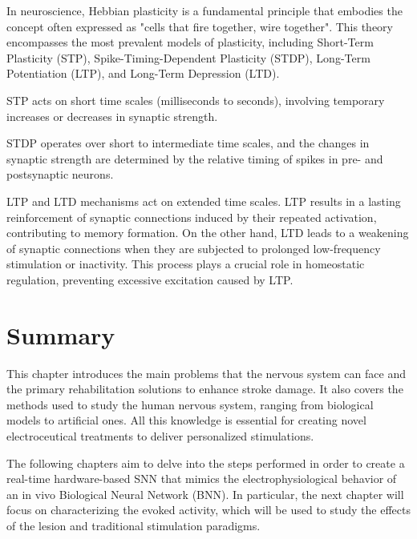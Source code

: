 In neuroscience, Hebbian plasticity \cite{Hebb1949} is a fundamental principle that embodies the concept often expressed as "cells that fire together, wire together". This theory encompasses the most prevalent models of plasticity, including Short-Term Plasticity (STP), Spike-Timing-Dependent Plasticity (STDP), Long-Term Potentiation (LTP), and Long-Term Depression (LTD).

STP acts on short time scales (milliseconds to seconds), involving temporary increases or decreases in synaptic strength.

STDP operates over short to intermediate time scales, and the changes in synaptic strength are determined by the relative timing of spikes in pre- and postsynaptic neurons.

LTP and LTD mechanisms act on extended time scales. LTP results in a lasting reinforcement of synaptic connections induced by their repeated activation, contributing to memory formation. On the other hand, LTD leads to a weakening of synaptic connections when they are subjected to prolonged low-frequency stimulation or inactivity. This process plays a crucial role in homeostatic regulation, preventing excessive excitation caused by LTP.

\section{Summary}

This chapter introduces the main problems that the nervous system can face and the primary rehabilitation solutions to enhance stroke damage. It also covers the methods used to study the human nervous system, ranging from biological models to artificial ones. All this knowledge is essential for creating novel electroceutical treatments to deliver personalized stimulations.

The following chapters aim to delve into the steps performed in order to create a real-time hardware-based SNN that mimics the electrophysiological behavior of an in vivo Biological Neural Network (BNN). In particular, the next chapter will focus on characterizing the evoked activity, which will be used to study the effects of the lesion and traditional stimulation paradigms.

